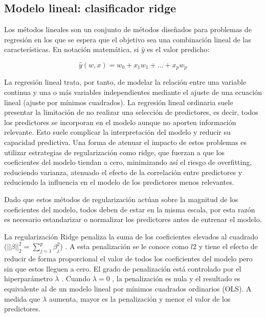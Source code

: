 
\subsection{Modelo lineal: clasificador ridge}

Los métodos lineales son un conjunto de métodos diseñados para problemas de regresión en los que se espera que el objetivo sea una combinación lineal de las características.
En notación matemática, si $\hat{y}$ es el valor predicho:

\begin{equation}
    \hat{y}(w,x)=w_{0} + x_{1}w_{1} + \dots + x_{p}w_{p}
\end{equation}

La regresión lineal trata, por tanto, de modelar la relación entre una variable continua y una o más variables independientes mediante el ajuste de una ecuación lineal (ajuste por mínimos cuadrados). 
La regresión lineal ordinaria suele presentar la limitación de no realizar una selección de predictores, es decir, todos los predictores se incorporan en el modelo aunque no aporten información relevante. Esto suele complicar la interpretación del modelo y reducir su capacidad predictiva.
Una forma de atenuar el impacto de estos problemas es utilizar estrategias de regularización como ridge, que fuerzan a que los coeficientes del modelo tiendan a cero, minimizando así el riesgo de overfitting, reduciendo varianza, atenuado el efecto de la correlación entre predictores y reduciendo la influencia en el modelo de los predictores menos relevantes.

Dado que estos métodos de regularización actúan sobre la magnitud de los coeficientes del modelo, todos deben de estar en la misma escala, por esta razón es necesario estandarizar o normalizar los predictores antes de entrenar el modelo.

La regularización Ridge penaliza la suma de los coeficientes elevados al cuadrado  ($||\beta||_{2}^{2}=\sum^{p}_{j=1}\beta^{2}_{j}$) . 
A esta penalización se le conoce como $l2$ y tiene el efecto de reducir de forma proporcional el valor de todos los coeficientes del modelo pero sin que estos lleguen a cero. El grado de penalización está controlado por el hiperparámetro  $\lambda$ . Cuando  $\lambda=0$ , la penalización es nula y el resultado es equivalente al de un modelo lineal por mínimos cuadrados ordinarios (OLS). A medida que  $\lambda$  aumenta, mayor es la penalización y menor el valor de los predictores.

